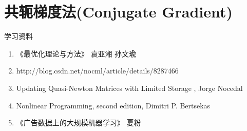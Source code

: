 \documentclass[a4paper,10pt]{ctexbook}
\begin{document}
\section{共轭梯度法(Conjugate Gradient)}
学习资料
\begin{enumerate}
\item《最优化理论与方法》 袁亚湘 孙文瑜
\item http://blog.csdn.net/nocml/article/details/8287466
\item Updating Quasi-Newton Matrices with Limited Storage , Jorge Nocedal
\item Nonlinear Programming, second edition, Dimitri P. Bertsekas
\item《广告数据上的大规模机器学习》  夏粉
\end{enumerate}

\ifx\mlbook\undefined
    
\end{document}

